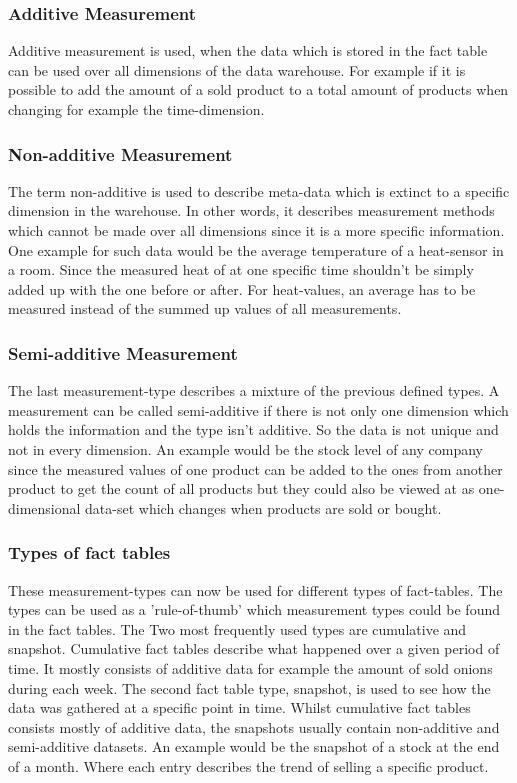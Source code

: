 \documentclass[12pt,a4paper,oneside, 
liststotoc, 					%
bibtotoc,						%
titlepage, 						%
headsepline, 					%
BCOR6mm,						%
openany,							%
]{scrreprt}
\begin{document}
\subsubsection{Additive Measurement}
Additive measurement is used, when the data which is stored in the fact table can be used over all dimensions of the data warehouse. For example if it is possible to add the amount of a sold product to a total amount of products when changing for example the time-dimension. 
\subsubsection{Non-additive Measurement}
The term non-additive is used to describe meta-data which is extinct to a specific dimension in the warehouse. In other words, it describes measurement methods which cannot be made over all dimensions since it is a more specific information. One example for such data would be the average temperature of a heat-sensor in a room. Since the measured heat of at one specific time shouldn't be simply added up with the one before or after. For heat-values, an average has to be measured instead of the summed up values of all measurements.
\subsubsection{Semi-additive Measurement}
The last measurement-type describes a mixture of the previous defined types. A measurement can be called semi-additive if there is not only one dimension which holds the information and the type isn't additive. So the data is not unique and not in every dimension. An example would be the stock level of any company since the measured values of one product can be added to the ones from another product to get the count of all products but they could also be viewed at as one-dimensional data-set which changes when products are sold or bought.
\subsubsection{Types of fact tables}
These measurement-types can now be used for different types of fact-tables. The types can be used as a 'rule-of-thumb' which measurement types could be found in the fact tables. The Two most frequently used types are cumulative and snapshot. Cumulative fact tables describe what happened over a given period of time. It mostly consists of additive data for example the amount of sold onions during each week. The second fact table type, snapshot, is used to see how the data was gathered at a specific point in time. Whilst cumulative fact tables consists mostly of additive data, the snapshots usually contain non-additive and semi-additive datasets. An example would be the snapshot of a stock at the end of a month. Where each entry describes the trend of selling a specific product.
\end{document}
